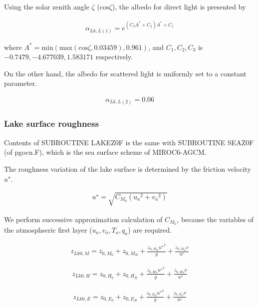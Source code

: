 Using the solar zenith angle \(\zeta\) (\(\mathrm{cos}\zeta\)), the albedo for direct light is presented by

\begin{eqnarray}
    \alpha_{Lk,L(1)} = e^{(C_3A^\ast + C_2) A^\ast +C_1}
\end{eqnarray}

where \(A^\ast = \mathrm{min}(\mathrm{max}(\mathrm{cos}\zeta,0.03459),0.961)\), and \(C_1, C_2, C_3\) is \(-0.7479, -4.677039, 1.583171\) respectively.

On the other hand, the albedo for scattered light is uniformly set to a constant parameter.

\begin{eqnarray}
    \alpha_{Lk,L(2)} = 0.06
\end{eqnarray}

\subsubsection{Lake surface roughness}\label{lake-surface-roughness}

Contents of SUBROUTINE LAKEZ0F is the same with SUBROUTINE SEAZ0F (of pgocn.F), which is the sea surface scheme of MIROC6-AGCM\citep{Tatebe2019-ow}.

The roughness variation of the lake surface is determined by the friction velocity \(u^\star\).

\begin{eqnarray}
u^{\star} = \sqrt{C_{M_0} ({u_a}^2  +{v_a}^2)}
\end{eqnarray}

We perform successive approximation calculation of \({C_{M_0}}\), because the variables of the atmosphseric first layer (\(u_a,v_a,T_a,q_a\)) are required.

\begin{eqnarray}
    z_{Lk0,M} = z_{0,M_0} + z_{0,M_R} + \frac{z_{0,M_R} {u^\star }^2 }{g} + \frac{z_{0,M_S}\nu }{u^\star}
\end{eqnarray}

\begin{eqnarray}
    z_{Lk0,H} = z_{0,H_0} + z_{0,H_R} + \frac{z_{0,H_R} {u^\star }^2 }{g} + \frac{z_{0,H_S}\nu }{u^\star}
\end{eqnarray}

\begin{eqnarray}
    z_{Lk0,E} = z_{0,E_0} + z_{0,E_R} + \frac{z_{0,E_R} {u^\star }^2 }{g} + \frac{z_{0,E_S}\nu }{u^\star}
\end{eqnarray}

